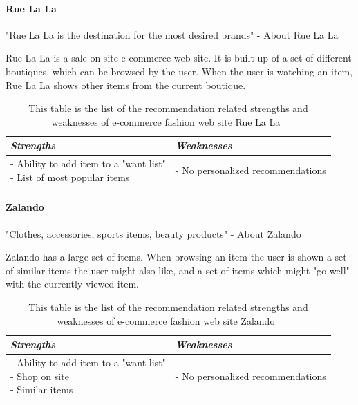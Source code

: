 \paragraph{Rue La La} %
\label{par:rue_la_la}
    "Rue La La is the destination for the most desired brands" - About Rue La La~\cite{RueLaLa}

    Rue La La is a sale on site e-commerce web site.
    It is built up of a set of different boutiques, which can be browsed by the user.
    When the user is watching an item, Rue La La shows other items from the current boutique.

    \begin{table}[H]
        \centering
        \begin{tabular}{l|l}
            \toprule
            \emph{Strengths} & \emph{Weaknesses} \\ \hline
            \pbox{9cm}{
                - Ability to add item to a "want list" \\
                - List of most popular items
            } & \pbox{9cm}{
                - No personalized recommendations \\
            } \\ \bottomrule
        \end{tabular}
        \caption[Recommendation related strengths and weaknesses of Rue La La~\cite{RueLaLa}]{This table is the list of the recommendation related strengths and weaknesses of e-commerce fashion web site Rue La La~\cite{RueLaLa}}
        \label{table:ecommenreceRueLaLa}
    \end{table}

\paragraph{Zalando} %
\label{par:zalando}
    "Clothes, accessories, sports items, beauty products" - About Zalando~\cite{Zalando}

    Zalando has a large set of items.
    When browsing an item the user is shown a set of similar items the user might also like, and a set of items which might "go well"  with the currently viewed item.
    \begin{table}[H]
        \centering
        \begin{tabular}{l|l}
            \toprule
            \emph{Strengths} & \emph{Weaknesses} \\ \hline
            \pbox{9cm}{
                - Ability to add item to a "want list" \\
                - Shop on site \\
                - Similar items
            } & \pbox{9cm}{
                - No personalized recommendations \\
            } \\ \bottomrule
        \end{tabular}
        \caption[Recommendation related strengths and weaknesses of Zalando~\cite{Zalando}]{This table is the list of the recommendation related strengths and weaknesses of e-commerce fashion web site Zalando~\cite{Zalando}}
        \label{table:ecommenreceZalando}
    \end{table}

